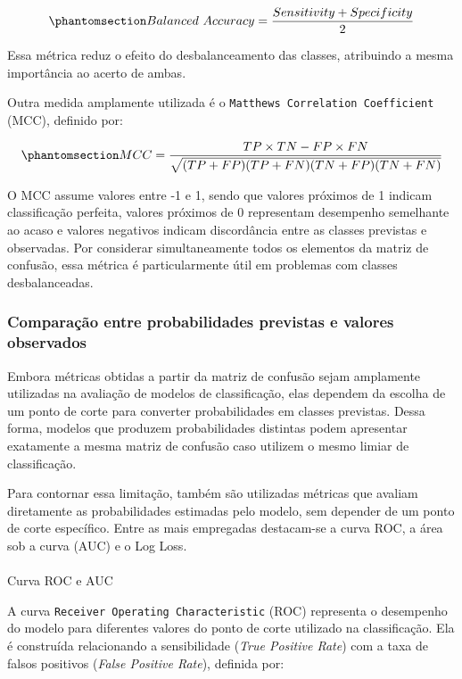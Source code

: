 \documentclass[
  brazilian,
  12pt,
  letterpaper,
  DIV=11,
  numbers=noendperiod]{scrartcl}
\makeatletter
\let\oldparagraph\paragraph
\renewcommand{\paragraph}{
    \@ifstar
      \xxxParagraphStar
      \xxxParagraphNoStar
  }
\newcommand{\xxxParagraphStar}[1]{\oldparagraph*{#1}\mbox{}}
\newcommand{\xxxParagraphNoStar}[1]{\oldparagraph{#1}\mbox{}}
\makeatother
\begin{document}
\begin{equation}\protect\phantomsection\label{eq-balanced-accuracy}{
Balanced\ Accuracy=
\frac{Sensitivity+Specificity}{2}
}\end{equation}

Essa métrica reduz o efeito do desbalanceamento das classes, atribuindo
a mesma importância ao acerto de ambas.

Outra medida amplamente utilizada é o
\texttt{Matthews\ Correlation\ Coefficient} (MCC), definido por:

\begin{equation}\protect\phantomsection\label{eq-mcc}{
MCC=
\frac{TP\times TN-FP\times FN}
{\sqrt{(TP+FP)(TP+FN)(TN+FP)(TN+FN)}}
}\end{equation}

O MCC assume valores entre -1 e 1, sendo que valores próximos de 1
indicam classificação perfeita, valores próximos de 0 representam
desempenho semelhante ao acaso e valores negativos indicam discordância
entre as classes previstas e observadas. Por considerar simultaneamente
todos os elementos da matriz de confusão, essa métrica é particularmente
útil em problemas com classes desbalanceadas.

\subsubsection{Comparação entre probabilidades previstas e valores
observados}\label{comparauxe7uxe3o-entre-probabilidades-previstas-e-valores-observados}

Embora métricas obtidas a partir da matriz de confusão sejam amplamente
utilizadas na avaliação de modelos de classificação, elas dependem da
escolha de um ponto de corte para converter probabilidades em classes
previstas. Dessa forma, modelos que produzem probabilidades distintas
podem apresentar exatamente a mesma matriz de confusão caso utilizem o
mesmo limiar de classificação.

Para contornar essa limitação, também são utilizadas métricas que
avaliam diretamente as probabilidades estimadas pelo modelo, sem
depender de um ponto de corte específico. Entre as mais empregadas
destacam-se a curva ROC, a área sob a curva (AUC) e o Log Loss.

\paragraph{Curva ROC e AUC}\label{curva-roc-e-auc}

A curva \texttt{Receiver\ Operating\ Characteristic} (ROC) representa o
desempenho do modelo para diferentes valores do ponto de corte utilizado
na classificação. Ela é construída relacionando a sensibilidade
(\emph{True Positive Rate}) com a taxa de falsos positivos (\emph{False
Positive Rate}), definida por:
\end{document}
